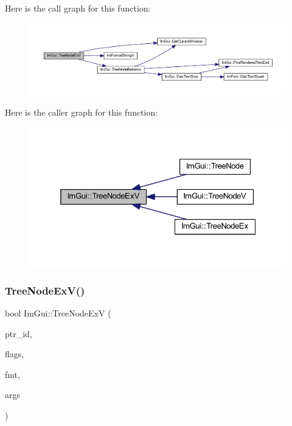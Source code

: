 Here is the call graph for this function\+:
\nopagebreak
\begin{figure}[H]
\begin{center}
\leavevmode
\includegraphics[width=350pt]{namespace_im_gui_a251cd4acbdad4cef2246d9b573a83ce0_cgraph}
\end{center}
\end{figure}
Here is the caller graph for this function\+:
\nopagebreak
\begin{figure}[H]
\begin{center}
\leavevmode
\includegraphics[width=325pt]{namespace_im_gui_a251cd4acbdad4cef2246d9b573a83ce0_icgraph}
\end{center}
\end{figure}
\mbox{\label{namespace_im_gui_aaae827898572d17e064a88a1afc8e6b0}} 
\subsubsection{\texorpdfstring{Tree\+Node\+Ex\+V()}{TreeNodeExV()}\hspace{0.1cm}{\footnotesize\ttfamily [2/2]}}
{\footnotesize\ttfamily bool Im\+Gui\+::\+Tree\+Node\+ExV (\begin{DoxyParamCaption}\item[{const void $\ast$}]{ptr\+\_\+id,  }\item[{\mbox{\hyperlink{imgui_8h_a0588fdd10c59b49a0159484fe9ec4564}{Im\+Gui\+Tree\+Node\+Flags}}}]{flags,  }\item[{const char $\ast$}]{fmt,  }\item[{va\+\_\+list}]{args }\end{DoxyParamCaption})}

